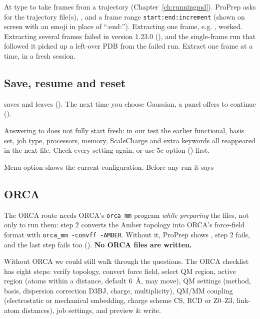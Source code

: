 At  type  to take frames from a trajectory
(Chapter~\ref{ch:runningmd}). ProPrep asks for the trajectory file(s),
, and a frame range
\texttt{start:end:increment} (shown on screen with an emoji in place of
``:end:''). Extracting one frame, e.g. , worked. Extracting
several frames failed in version 1.23.0
(), and the single-frame run that
followed it picked up a left-over PDB from the failed run. Extract one frame
at a time, in a fresh session.

\subsection{Save, resume and reset}

 saves and leaves (). The
next time you choose Gaussian, a  panel offers to
continue ().

\begin{watchout}
Answering  to  does not fully start
fresh: in our test the earlier functional, basis set, job type, processors,
memory, ScaleCharge and extra keywords all reappeared in the next file. Check
every setting again, or use 5c option  () first.
\end{watchout}

Menu option  shows the current configuration. Before any run it says

\subsection{ORCA}
\label{sec:qmmm-orca}

\begin{needsoftware}
The ORCA route needs ORCA's \texttt{orca\_mm} program \emph{while preparing}
the files, not only to run them: step 2 converts the Amber topology into
ORCA's force-field format with \texttt{orca\_mm -convff -AMBER}. Without it,
ProPrep shows , step 2 fails, and the last
step fails too (). \textbf{No ORCA files are written.}
\end{needsoftware}

Without ORCA we could still walk through the questions. The ORCA checklist
has eight steps: verify topology, convert force field, select QM region,
active region (atoms within a distance, default 6~\AA, may move), QM settings
(method, basis, dispersion correction D3BJ, charge, multiplicity), QM/MM
coupling (electrostatic or mechanical embedding, charge scheme CS, RCD or
Z0--Z3, link-atom distances), job settings, and preview \& write.

